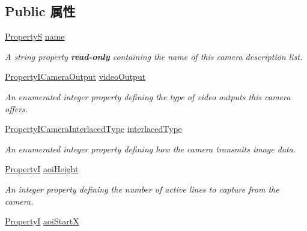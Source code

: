 \subsection*{Public 属性}
\begin{DoxyCompactItemize}
\item 
\hypertarget{classmv_i_m_p_a_c_t_1_1acquire_1_1_camera_description_base_a9bc921e1dbf216ffa7235163c270f2f5}{\hyperlink{classmv_i_m_p_a_c_t_1_1acquire_1_1_property_s}{Property\+S} \hyperlink{classmv_i_m_p_a_c_t_1_1acquire_1_1_camera_description_base_a9bc921e1dbf216ffa7235163c270f2f5}{name}}\label{classmv_i_m_p_a_c_t_1_1acquire_1_1_camera_description_base_a9bc921e1dbf216ffa7235163c270f2f5}

\begin{DoxyCompactList}\small\item\em A string property {\bfseries read-\/only} containing the name of this camera description list. \end{DoxyCompactList}\item 
\hyperlink{group___common_interface_ga48585b26ebc31ccee54f34c7d6bbdda3}{Property\+I\+Camera\+Output} \hyperlink{classmv_i_m_p_a_c_t_1_1acquire_1_1_camera_description_base_ad9b68e97cdf203d455e773e0901324a7}{video\+Output}
\begin{DoxyCompactList}\small\item\em An enumerated integer property defining the type of video outputs this camera offers. \end{DoxyCompactList}\item 
\hyperlink{group___device_specific_interface_gad01921546e8dc7787753af3e80401ab4}{Property\+I\+Camera\+Interlaced\+Type} \hyperlink{classmv_i_m_p_a_c_t_1_1acquire_1_1_camera_description_base_accd697662a91ec66a710677104ab1fe1}{interlaced\+Type}
\begin{DoxyCompactList}\small\item\em An enumerated integer property defining how the camera transmits image data. \end{DoxyCompactList}\item 
\hypertarget{classmv_i_m_p_a_c_t_1_1acquire_1_1_camera_description_base_a9171f2b04296ef8bd8768b50da62a3c0}{\hyperlink{group___common_interface_ga12d5e434238ca242a1ba4c6c3ea45780}{Property\+I} \hyperlink{classmv_i_m_p_a_c_t_1_1acquire_1_1_camera_description_base_a9171f2b04296ef8bd8768b50da62a3c0}{aoi\+Height}}\label{classmv_i_m_p_a_c_t_1_1acquire_1_1_camera_description_base_a9171f2b04296ef8bd8768b50da62a3c0}

\begin{DoxyCompactList}\small\item\em An integer property defining the number of active lines to capture from the camera. \end{DoxyCompactList}\item 
\hypertarget{classmv_i_m_p_a_c_t_1_1acquire_1_1_camera_description_base_a1a54bb523e9d28917a14ca67c3dbcd46}{\hyperlink{group___common_interface_ga12d5e434238ca242a1ba4c6c3ea45780}{Property\+I} \hyperlink{classmv_i_m_p_a_c_t_1_1acquire_1_1_camera_description_base_a1a54bb523e9d28917a14ca67c3dbcd46}{aoi\+Start\+X}}\label{classmv_i_m_p_a_c_t_1_1acquire_1_1_camera_description_base_a1a54bb523e9d28917a14ca67c3dbcd46}


\end{DoxyCompactItemize}
